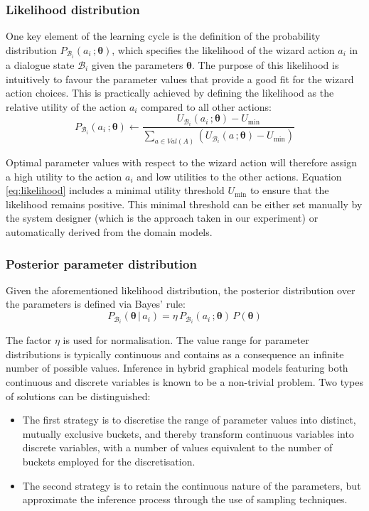 \subsubsection*{Likelihood distribution}

One key element of the learning cycle is the definition of the probability distribution $P_{\mathcal{B}_i}(a_i\,; \boldsymbol\theta)$, which specifies the likelihood of the wizard action $a_i$ in a dialogue state $\mathcal{B}_i$ given the parameters $\boldsymbol\theta$. The purpose of this likelihood is intuitively to favour the parameter values that provide a good fit for the wizard action choices. This is practically achieved by defining the likelihood as the relative utility of the action $a_i$ compared to all other actions: 
\begin{equation}
P_{\mathcal{B}_i}(a_i\,; \boldsymbol\theta) \leftarrow \dfrac{U_{\mathcal{B}_i}(a_i\,; \boldsymbol\theta) - U_{\mathrm{min}}}{\sum_{a \in Val(A)} \left(U_{\mathcal{B}_i}(a\,; \boldsymbol\theta) - U_{\mathrm{min}}\right)} \label{eq:likelihood}
\end{equation}

Optimal parameter values with respect to the wizard action will therefore assign a high utility to the action $a_i$ and low utilities to the other actions. Equation \eqref{eq:likelihood} includes a minimal utility threshold $U_{\mathrm{min}}$ to ensure that the likelihood remains positive. This minimal threshold can be either set manually by the system designer (which is the approach taken in our experiment) or automatically derived from the domain models. 

\subsubsection*{Posterior parameter distribution}

Given the aforementioned likelihood distribution, the posterior distribution over the parameters is defined via Bayes' rule: 
\begin{equation}
P_{\mathcal{B}_i}(\boldsymbol\theta \, | \, a_i) = \eta \, P_{\mathcal{B}_i}(a_i\,; \boldsymbol\theta) \, P(\boldsymbol\theta ) \label{eq:paramposterior}
\end{equation}

The factor $\eta$ is used for normalisation. The value range for parameter distributions is typically continuous and contains as a consequence an infinite number of possible values. Inference in hybrid graphical models featuring both continuous and discrete variables is known to be a non-trivial problem.  Two types of solutions can be distinguished:
\begin{itemize}
\item The first strategy is to discretise the range of parameter values into distinct, mutually exclusive buckets, and thereby transform continuous variables into discrete variables, with a number of values equivalent to the number of buckets employed for the discretisation.
\item The second strategy is to retain the continuous nature of the parameters, but approximate the inference process through the use of sampling techniques.  
\end{itemize}

